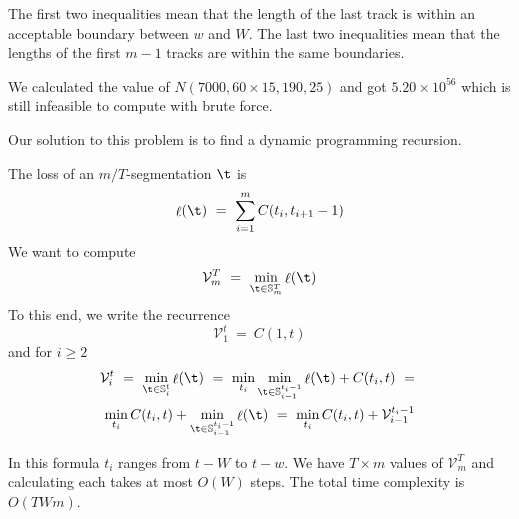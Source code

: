 \documentclass[twocolumn]{article}
\DeclareMathOperator{\loss}{\ell}
\newcommand{\segs}{\mathbb S}
\newcommand{\best}{\mathcal V}
\begin{document}
The first two inequalities mean that the length of the last track is within an acceptable boundary between $w$ and $W$. The last two inequalities mean that the lengths of the first $m-1$ tracks are within the same boundaries. 

We calculated the value of $N(7000, 60\times15, 190, 25)$ and got $5.20 \times 10^{56}$ which is still infeasible to compute with brute force.



Our solution to this problem is to find a dynamic programming recursion.

The loss of an $m/T$-segmentation $\t$ is 
\[
\loss(\t) 
~=~
\sum_{i=1}^m C(t_i, t_{i+1}-1)
\]
We want to compute
\[
\best^T_m ~=~ \min_{\t \in \segs^T_m} \loss(\t)
\]
To this end, we write the recurrence
\begin{equation*}
\best^t_1 ~=~ C(1, t) 
\end{equation*}
and for $i\ge2$
\begin{multline*}
\best^t_i ~=~
\min_{\t \in \segs^t_i} \loss(\t)
~=~ \min_{t_i} \min_{\t \in \segs^{t_i-1}_{i-1}} \loss(\t) + C(t_i, t)~=~  \\
\min_{t_i} C(t_i, t) + \min_{\t \in \segs^{t_i-1}_{i-1}} \loss(\t) 
~=~ \min_{t_i} C(t_i, t) + \best^{t_i-1}_{i-1}
\end{multline*}

In this formula $t_i$ ranges from $t-W$ to $t-w$. We have $T \times m$ values of $\best^T_m$ and calculating each takes at most $O(W)$ steps. The total time complexity is $O(TWm)$.
\end{document}
